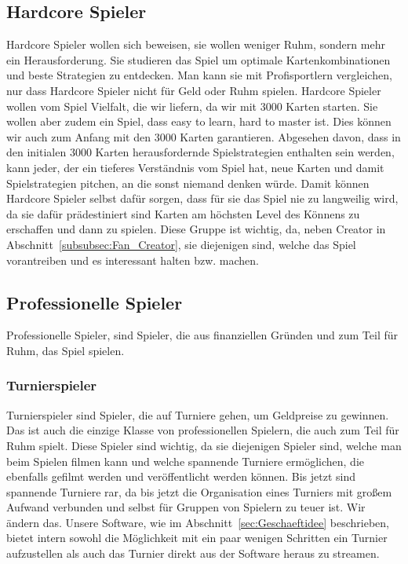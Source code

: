 \documentclass[fontsize=12, a4aper]{scrartcl}
\begin{document}
\subsection{Hardcore Spieler} \label{subsec:Hardcore_Spieler}

Hardcore Spieler wollen sich beweisen, sie wollen weniger Ruhm, sondern mehr ein Herausforderung. Sie studieren das Spiel um optimale Kartenkombinationen und beste Strategien zu entdecken. Man kann sie mit Profisportlern vergleichen, nur dass Hardcore Spieler nicht für Geld oder Ruhm spielen. Hardcore Spieler wollen vom Spiel Vielfalt, die wir liefern, da wir mit 3000 Karten starten. Sie wollen aber zudem ein Spiel, dass \glqq easy to learn, hard to master\grqq{} ist. Dies können wir auch zum Anfang mit den 3000 Karten garantieren. Abgesehen davon, dass in den initialen 3000 Karten herausfordernde Spielstrategien enthalten sein werden, kann jeder, der ein tieferes Verständnis vom Spiel hat, neue Karten und damit Spielstrategien pitchen, an die sonst niemand denken würde. Damit können Hardcore Spieler selbst dafür sorgen, dass für sie das Spiel nie zu langweilig wird, da sie dafür prädestiniert sind Karten am höchsten Level des Könnens zu erschaffen und dann zu spielen. Diese Gruppe ist wichtig, da, neben \glqq Creator\grqq{} in Abschnitt~\ref{subsubsec:Fan_Creator}, sie diejenigen sind, welche das Spiel vorantreiben und es interessant halten bzw. machen.

\subsection{Professionelle Spieler}

Professionelle Spieler, sind Spieler, die aus finanziellen Gründen und zum Teil für Ruhm, das Spiel spielen.

\subsubsection{Turnierspieler} \label{subsubsec:Professioneller_Spieler_Turnierspieler}

Turnierspieler sind Spieler, die auf Turniere gehen, um Geldpreise zu gewinnen. Das ist auch die einzige Klasse von professionellen Spielern, die auch zum Teil für Ruhm spielt. Diese Spieler sind wichtig, da sie diejenigen Spieler sind, welche man beim Spielen filmen kann und welche spannende Turniere ermöglichen, die ebenfalls gefilmt werden und veröffentlicht werden können. Bis jetzt sind spannende Turniere rar, da bis jetzt die Organisation eines Turniers mit großem Aufwand verbunden und selbst für Gruppen von Spielern zu teuer ist. Wir ändern das. Unsere Software, wie im Abschnitt~\ref{sec:Geschaeftidee} beschrieben, bietet intern sowohl die Möglichkeit mit ein paar wenigen Schritten ein Turnier aufzustellen als auch das Turnier direkt aus der Software heraus zu streamen.
\end{document}
